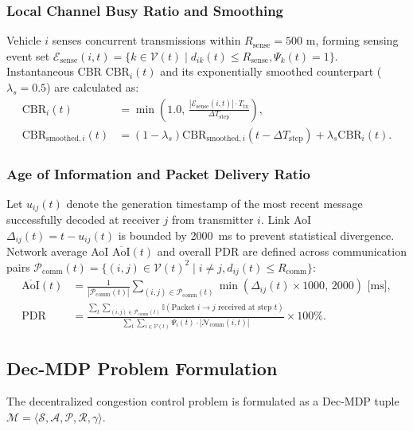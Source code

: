 \documentclass[journal]{IEEEtran}
\begin{document}
\subsubsection{Local Channel Busy Ratio and Smoothing}
Vehicle $i$ senses concurrent transmissions within $R_{\text{sense}} = 500\text{ m}$, forming sensing event set $\mathcal{E}_{\text{sense}}(i, t) = \{k \in \mathcal{V}(t) \mid d_{ik}(t) \le R_{\text{sense}}, \Psi_k(t) = 1\}$. Instantaneous CBR $\text{CBR}_i(t)$ and its exponentially smoothed counterpart ($\lambda_s = 0.5$) are calculated as:
\begin{align}
\label{eq:cbr_inst}
\text{CBR}_i(t) &= \min\left(1.0, \, \frac{|\mathcal{E}_{\text{sense}}(i, t)| \cdot T_{\text{tx}}}{\Delta T_{\text{step}}}\right), \\
\label{eq:cbr_ema}
\text{CBR}_{\text{smoothed}, i}(t) &= (1 - \lambda_s)\text{CBR}_{\text{smoothed}, i}(t - \Delta T_{\text{step}}) + \lambda_s \text{CBR}_i(t).
\end{align}

\subsubsection{Age of Information and Packet Delivery Ratio}
Let $u_{ij}(t)$ denote the generation timestamp of the most recent message successfully decoded at receiver $j$ from transmitter $i$. Link AoI $\Delta_{ij}(t) = t - u_{ij}(t)$ is bounded by 2000~ms to prevent statistical divergence. Network average AoI $\overline{\text{AoI}}(t)$ and overall PDR are defined across communication pairs $\mathcal{P}_{\text{comm}}(t) = \{(i, j) \in \mathcal{V}(t)^2 \mid i \neq j, d_{ij}(t) \le R_{\text{comm}}\}$:
\begin{align}
\label{eq:net_aoi}
\overline{\text{AoI}}(t) &= \frac{1}{|\mathcal{P}_{\text{comm}}(t)|} \sum_{(i,j) \in \mathcal{P}_{\text{comm}}(t)} \min\left(\Delta_{ij}(t) \times 1000, \, 2000\right)\text{ [ms]}, \\
\label{eq:pdr_def}
\text{PDR} &= \frac{\sum_{t} \sum_{(i,j) \in \mathcal{P}_{\text{comm}}(t)} \mathbb{I}(\text{Packet } i \to j \text{ received at step } t)}{\sum_{t} \sum_{i \in \mathcal{V}(t)} \Psi_i(t) \cdot |\mathcal{N}_{\text{comm}}(i, t)|} \times 100\%.
\end{align}

\subsection{Dec-MDP Problem Formulation}
The decentralized congestion control problem is formulated as a Dec-MDP tuple $\mathcal{M} = \langle \mathcal{S}, \mathcal{A}, \mathcal{P}, \mathcal{R}, \gamma \rangle$.
\end{document}
